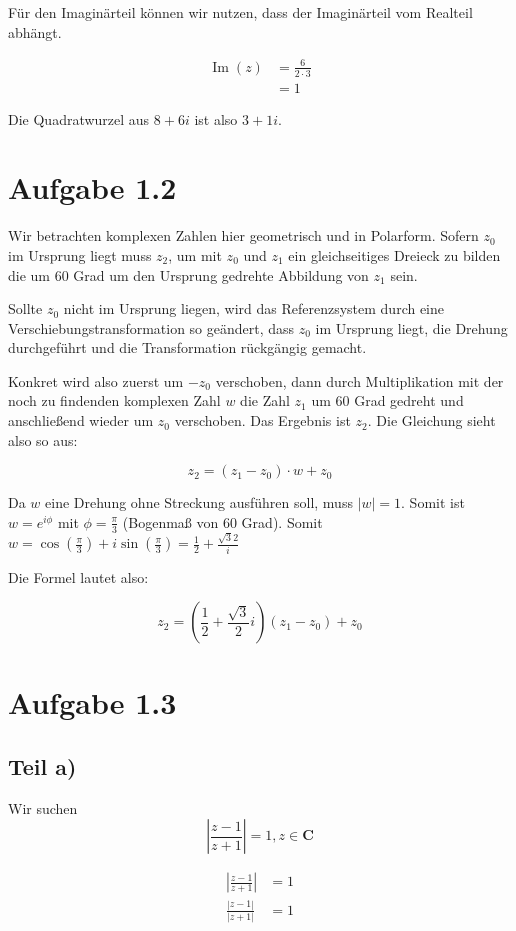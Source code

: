 \documentclass[a4paper,german,12pt]{article}
\begin{document}
Für den Imaginärteil können wir nutzen, dass der Imaginärteil vom Realteil abhängt.

\begin{align}
\operatorname{Im}(z) &= \frac{6}{2 \cdot 3} \\
&= 1
\end{align}

Die Quadratwurzel aus $8+6i$ ist also $3 + 1i$.

\section*{Aufgabe 1.2}

Wir betrachten komplexen Zahlen hier geometrisch und in Polarform. Sofern $z_0$
im Ursprung liegt muss $z_2$, um mit $z_0$ und $z_1$ ein gleichseitiges Dreieck
zu bilden die um 60 Grad um den Ursprung gedrehte Abbildung von $z_1$ sein.

Sollte $z_0$ nicht im Ursprung liegen, wird das Referenzsystem durch eine
Verschiebungstransformation so geändert, dass $z_0$ im Ursprung liegt, die
Drehung durchgeführt und die Transformation rückgängig gemacht.

Konkret wird also zuerst um $-z_0$ verschoben, dann durch Multiplikation mit
der noch zu findenden komplexen Zahl $w$ die Zahl $z_1$ um 60 Grad gedreht und
anschließend wieder um $z_0$ verschoben. Das Ergebnis ist $z_2$. Die Gleichung
sieht also so aus:

$$z_2 = (z_1 - z_0) \cdot w + z_0$$

Da $w$ eine Drehung ohne Streckung ausführen soll, muss $|w| = 1$. Somit ist $w
= e^{i\phi}$ mit $\phi = \frac{\pi}{3}$ (Bogenmaß von 60 Grad). Somit $w =
\cos(\frac{\pi}{3}) + i\sin(\frac{\pi}{3}) = \frac{1}{2} +
\frac{\sqrt{3}{2}}i$

Die Formel lautet also:

$$z_2 = \left(\frac{1}{2} + \frac{\sqrt{3}}{2}i\right) \left(z_1 - z_0\right)  + z_0$$

\section*{Aufgabe 1.3}
\subsection*{Teil a)}

Wir suchen $$\left|\frac{z-1}{z+1}\right| = 1, z \in \mathbf{C}$$

\begin{align}
\left|\frac{z-1}{z+1}\right| &= 1 \\
\frac{|z-1|}{|z+1|} &= 1
\end{align}
\end{document}
